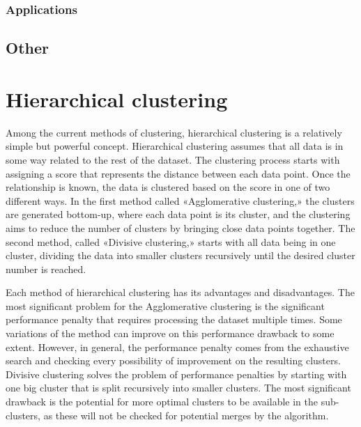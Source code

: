 
\subsubsection{Applications}

\subsection{Other}

\section{Hierarchical clustering}



Among the current methods of clustering, hierarchical clustering is a relatively simple but powerful concept. Hierarchical clustering assumes that all data is in some way related to the rest of the dataset. The clustering process starts with assigning a score that represents the distance between each data point. Once the relationship is known, the data is clustered based on the score in one of two different ways. In the first method called «Agglomerative clustering,» the clusters are generated bottom-up, where each data point is its cluster, and the clustering aims to reduce the number of clusters by bringing close data points together. The second method, called «Divisive clustering,» starts with all data being in one cluster, dividing the data into smaller clusters recursively until the desired cluster number is reached.

Each method of hierarchical clustering has its advantages and disadvantages. The most significant problem for the Agglomerative clustering is the significant performance penalty that requires processing the dataset multiple times. Some variations of the method can improve on this performance drawback to some extent. However, in general, the performance penalty comes from the exhaustive search and checking every possibility of improvement on the resulting clusters. Divisive clustering solves the problem of performance penalties by starting with one big cluster that is split recursively into smaller clusters. The most significant drawback is the potential for more optimal clusters to be available in the sub-clusters, as these will not be checked for potential merges by the algorithm.

